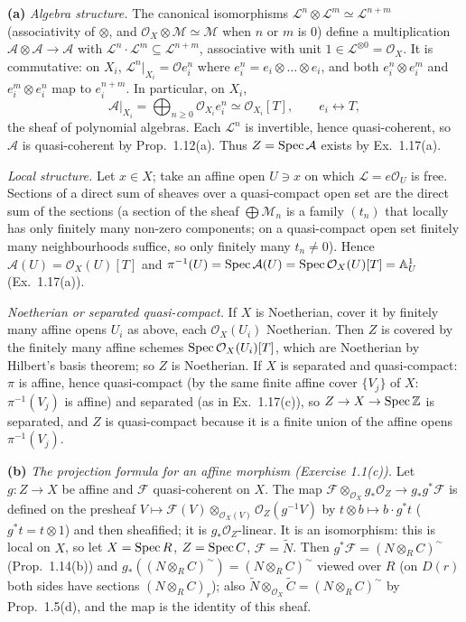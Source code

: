 \documentclass[11pt]{article}
\begin{document}
\textbf{(a)} \emph{Algebra structure.} The canonical isomorphisms $\mathcal L^n\otimes\mathcal L^m\simeq\mathcal L^{n+m}$ (associativity of $\otimes$, and $\mathcal O_X\otimes\mathcal M\simeq\mathcal M$ when $n$ or $m$ is $0$) define a multiplication $\mathcal A\otimes\mathcal A\to\mathcal A$ with $\mathcal L^n\cdot\mathcal L^m\subseteq\mathcal L^{n+m}$, associative with unit $1\in\mathcal L^{\otimes 0}=\mathcal O_X$. It is commutative: on $X_i$, $\mathcal L^n|_{X_i}=\mathcal O e_i^{n}$ where $e_i^n=e_i\otimes\dots\otimes e_i$, and both $e_i^n\otimes e_i^m$ and $e_i^m\otimes e_i^n$ map to $e_i^{n+m}$. In particular, on $X_i$,
\[ \mathcal A|_{X_i}=\bigoplus_{n\ge0}\mathcal O_{X_i}e_i^n\simeq\mathcal O_{X_i}[T],\qquad e_i\leftrightarrow T, \]
the sheaf of polynomial algebras. Each $\mathcal L^n$ is invertible, hence quasi-coherent, so $\mathcal A$ is quasi-coherent by Prop.~1.12(a). Thus $Z=\operatorname{Spec}\mathcal A$ exists by Ex.~1.17(a).

\emph{Local structure.} Let $x\in X$; take an affine open $U\ni x$ on which $\mathcal L=e\mathcal O_U$ is free. Sections of a direct sum of sheaves over a quasi-compact open set are the direct sum of the sections (a section of the sheaf $\bigoplus\mathcal M_n$ is a family $(t_n)$ that locally has only finitely many non-zero components; on a quasi-compact open set finitely many neighbourhoods suffice, so only finitely many $t_n\ne0$). Hence $\mathcal A(U)=\mathcal O_X(U)[T]$ and $\pi^{-1}(U)=\operatorname{Spec}\mathcal A(U)=\operatorname{Spec}\mathcal O_X(U)[T]=\mathbb A^1_U$ (Ex.~1.17(a)).

\emph{Noetherian or separated quasi-compact.} If $X$ is Noetherian, cover it by finitely many affine opens $U_i$ as above, each $\mathcal O_X(U_i)$ Noetherian. Then $Z$ is covered by the finitely many affine schemes $\operatorname{Spec}\mathcal O_X(U_i)[T]$, which are Noetherian by Hilbert's basis theorem; so $Z$ is Noetherian. If $X$ is separated and quasi-compact: $\pi$ is affine, hence quasi-compact (by the same finite affine cover $\{V_j\}$ of $X$: $\pi^{-1}(V_j)$ is affine) and separated (as in Ex.~1.17(c)), so $Z\to X\to\operatorname{Spec}\mathbb Z$ is separated, and $Z$ is quasi-compact because it is a finite union of the affine opens $\pi^{-1}(V_j)$.

\textbf{(b)} \emph{The projection formula for an affine morphism (Exercise 1.1(c)).} Let $g:Z\to X$ be affine and $\mathcal F$ quasi-coherent on $X$. The map $\mathcal F\otimes_{\mathcal O_X}g_*\mathcal O_Z\to g_*g^*\mathcal F$ is defined on the presheaf $V\mapsto\mathcal F(V)\otimes_{\mathcal O_X(V)}\mathcal O_Z(g^{-1}V)$ by $t\otimes b\mapsto b\cdot g^*t$ ($g^*t=t\otimes1$) and then sheafified; it is $g_*\mathcal O_Z$-linear. It is an isomorphism: this is local on $X$, so let $X=\operatorname{Spec} R$, $Z=\operatorname{Spec} C$, $\mathcal F=\widetilde N$. Then $g^*\mathcal F=(N\otimes_RC)^\sim$ (Prop.~1.14(b)) and $g_*((N\otimes_RC)^\sim)=(N\otimes_RC)^\sim$ viewed over $R$ (on $D(r)$ both sides have sections $(N\otimes_RC)_r$); also $\widetilde N\otimes_{\mathcal O_X}\widetilde C=(N\otimes_RC)^\sim$ by Prop.~1.5(d), and the map is the identity of this sheaf.
\end{document}
